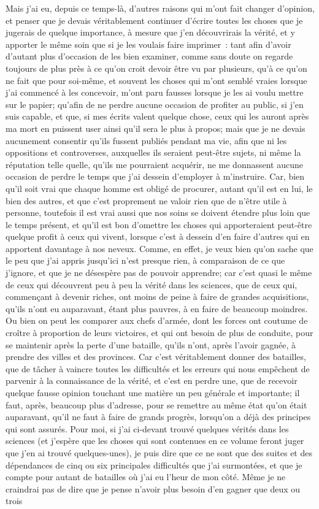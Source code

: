 \documentclass[french,twoside]{book} %
\begin{document}
Mais j'ai eu, depuis ce temps-là, d'autres raisons qui m'ont fait changer d'opinion, et penser que je devais véritablement continuer d'écrire toutes les choses que je jugerais de quelque importance, à mesure que j'en découvrirais la vérité, et y apporter le même soin que si je les voulais faire imprimer : tant afin d'avoir d'autant plus d'occasion de les bien examiner, comme sans doute on regarde toujours de plus près à ce qu'on croit devoir être vu par plusieurs, qu'à ce qu'on ne fait que pour soi-même, et souvent les choses qui m'ont semblé vraies lorsque j'ai commencé à les concevoir, m'ont paru fausses lorsque je les ai voulu mettre sur le papier; qu'afin de ne perdre aucune occasion de profiter au public, si j'en suis capable, et que, si mes écrits valent quelque chose, ceux qui les auront après ma mort en puissent user ainsi qu'il sera le plus à propos; mais que je ne devais aucunement consentir qu'ils fussent publiés pendant ma vie, afin que ni les oppositions et controverses, auxquelles ils seraient peut-être sujets, ni même la réputation telle quelle, qu'ils me pourraient acquérir, ne me donnassent aucune occasion de perdre le temps que j'ai dessein d'employer à m'instruire. Car, bien qu'il soit vrai que chaque homme est obligé de procurer, autant qu'il est en lui, le bien des autres, et que c'est proprement ne valoir rien que de n'être utile à personne, toutefois il est vrai aussi que nos soins se doivent étendre plus loin que le temps présent, et qu'il est bon d'omettre les choses qui apporteraient peut-être quelque profit à ceux qui vivent, lorsque c'est à dessein d'en faire d'autres qui en apportent davantage à nos neveux. Comme, en effet, je veux bien qu'on sache que le peu que j'ai appris jusqu'ici n'est presque rien, à comparaison de ce que j'ignore, et que je ne désespère pas de pouvoir apprendre; car c'est quasi le même de ceux qui découvrent peu à peu la vérité dans les sciences, que de ceux qui, commençant à devenir riches, ont moins de peine à faire de grandes acquisitions, qu'ils n'ont eu auparavant, étant plus pauvres, à en faire de beaucoup moindres. Ou bien on peut les comparer aux chefs d'armée, dont les forces ont coutume de croître à proportion de leurs victoires, et qui ont besoin de plus de conduite, pour se maintenir après la perte d'une bataille, qu'ils n'ont, après l'avoir gagnée, à prendre des villes et des provinces. Car c'est véritablement donner des batailles, que de tâcher à vaincre toutes les difficultés et les erreurs qui nous empêchent de parvenir à la connaissance de la vérité, et c'est en perdre une, que de recevoir quelque fausse opinion touchant une matière un peu générale et importante; il faut, après, beaucoup plus d'adresse, pour se remettre au même état qu'on était auparavant, qu'il ne faut à faire de grands progrès, lorsqu'on a déjà des principes qui sont assurés. Pour moi, si j'ai ci-devant trouvé quelques vérités dans les sciences (et j'espère que les choses qui sont contenues en ce volume feront juger que j'en ai trouvé quelques-unes), je puis dire que ce ne sont que des suites et des dépendances de cinq ou six principales difficultés que j'ai surmontées, et que je compte pour autant de batailles où j'ai eu l'heur de mon côté. Même je ne craindrai pas de dire que je pense n'avoir plus besoin d'en gagner que deux ou trois 
\end{document}
